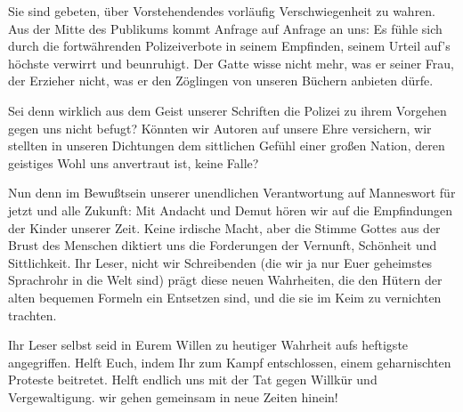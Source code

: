                   \pend
\pstart
           Sie sind gebeten, über Vorstehendendes vorläufig Verschwiegenheit zu wahren.\pend
           \vspace{1em}
\pstart
           \noindent{}{\pb}Aus der Mitte des Publikums kommt Anfrage auf Anfrage an
               uns: Es fühle sich durch die fortwährenden Polizeiverbote in seinem Empfinden, seinem
               Urteil auf’s höchste verwirrt und beunruhigt. Der Gatte wisse nicht mehr, was er
               seiner Frau, der Erzieher nicht, was er den Zöglingen von unseren Büchern anbieten
               dürfe.\pend
           
\pstart
           Sei denn wirklich aus dem Geist unserer Schriften die Polizei zu ihrem Vorgehen gegen
               uns nicht befugt? Könnten wir Autoren auf unsere Ehre versichern, wir stellten in
               unseren Dichtungen dem sittlichen Gefühl einer großen Nation, deren geistiges Wohl
               uns anvertraut ist, keine Falle?\pend
           
\pstart
           Nun denn im Bewußtsein unserer unendlichen Verantwortung auf Manneswort für jetzt und
               alle Zukunft: Mit Andacht und Demut hören wir auf die Empfindungen der Kinder unserer
               Zeit. Keine irdische Macht, aber die Stimme Gottes aus der Brust des Menschen
               diktiert uns die Forderungen der Vernunft, Schönheit und Sittlichkeit. Ihr Leser,
               nicht wir Schreibenden (die wir ja nur Euer geheimstes Sprachrohr in die Welt sind)
               prägt diese neuen Wahrheiten, die den Hütern der alten bequemen Formeln ein Entsetzen
               sind, und die sie im Keim zu vernichten trachten.\pend
           
\pstart
           Ihr Leser selbst seid in Eurem Willen zu heutiger Wahrheit aufs heftigste
               angegriffen. Helft Euch, indem Ihr zum Kampf entschlossen, einem geharnischten
               Proteste beitretet. Helft endlich uns mit der Tat gegen Willkür und Ver\introOben{}ge\introOben{}waltigung. wir gehen gemeinsam in neue Zeiten hinein!\pend
           \endnumbering{}  \newcommand{\dateiname}{L04013}\newcommand{\titel}{Carl Sternheim u.a. an Arthur Schnitzler, 22. 12. 1911}\newcommand{\editorInnen}{Selma Jahnke und Martin Anton Müller}
